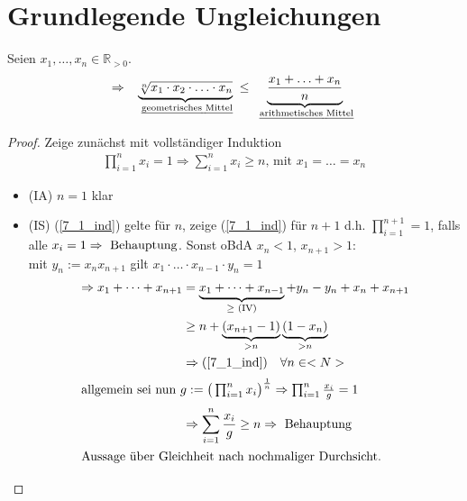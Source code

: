 \addtocounter{section}{7}
\section{Grundlegende Ungleichungen}
\begin{proposition}
	Seien $x_1, \dotsc, x_n\in\mathbb{R}_{>0}$.
	\[\Rightarrow \;\;\underbrace{\sqrt[n]{x_1\cdot x_2\cdot \dotsc \cdot x_n}}_{\text{\begriff{geometrisches Mittel}}} \le \underbrace{\frac{x_1 + \dotsc + x_n}{n}}_{\text{\begriff{arithmetisches Mittel}}}\]
\end{proposition}
\begin{proof}
	Zeige zunächst mit vollständiger Induktion
	\begin{align} %
	\prod_{i=1}^{n}x_i=1 \Rightarrow \sum\limits_{i=1}^{n} x_i \geq n \text{, mit } x_1=\dots=x_n \label{7_1_ind}
	\end{align}
	\begin{itemize}
		\item (IA) $n = 1$ klar
		\item (IS) (\ref{7_1_ind}) gelte für $n$, zeige (\ref{7_1_ind}) für $n+1$ d.h. $\prod_{i=1}^{n+1} = 1$, falls alle $x_i=1 \Rightarrow \text{ Behauptung}$. Sonst oBdA $x_n < 1$, $x_{n+1} > 1:$\\ mit $y_n:=x_n x_{n+1}$ gilt $x_1\cdot\dots\cdot x_{n-1}\cdot y_n=1$
		\begin{align*}
		\Rightarrow x_1 + \dots + x_{n+1} &= \underbrace{x_1+\dots+x_{n-1}}_{\geq \text{ (IV)}} + y_n - y_n + x_n+x_{n+1}\\ 
		&\geq n + \underbrace{(x_{n+1} -1)}_{>n}\underbrace{(1-x_n)}_{>n}\\ 
		&\Rightarrow (\ref{7_1_ind}) \quad\forall n \in <N>\\ 
		\shortintertext{allgemein sei nun $g:=\big( \prod_{i=1}^{n} x_i \big)^{\frac{1}{n}} \Rightarrow \prod_{i=1}^{n} \frac{x_i}{g} = 1$}
		&\Rightarrow \sum\limits_{i=1}^{n} \frac{x_i}{g} \geq n \Rightarrow \text{ Behauptung}\\ 
		\shortintertext{Aussage über Gleichheit nach nochmaliger Durchsicht.}
		\end{align*}
	\end{itemize} 
\end{proof}

